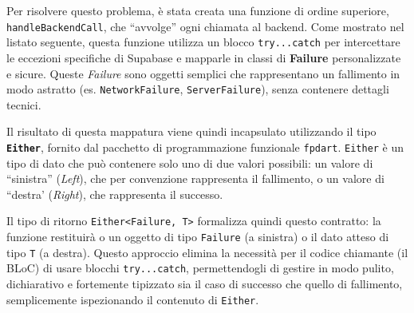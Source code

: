 Per risolvere questo problema, è stata creata una funzione di ordine superiore, \texttt{handleBackendCall}, che ``avvolge'' ogni chiamata al backend.
Come mostrato nel listato seguente, questa funzione utilizza un blocco \texttt{try...catch} per intercettare le eccezioni specifiche di Supabase e mapparle in classi di \textbf{Failure} personalizzate e sicure.
Queste \emph{Failure} sono oggetti semplici che rappresentano un fallimento in modo astratto (es. \texttt{NetworkFailure}, \texttt{ServerFailure}), senza contenere dettagli tecnici.

Il risultato di questa mappatura viene quindi incapsulato utilizzando il tipo \textbf{\texttt{Either}}, fornito dal pacchetto di programmazione funzionale \texttt{fpdart}. \texttt{Either} è un tipo di dato che può contenere solo uno di due valori possibili: un valore di ``sinistra'' (\emph{Left}), che per convenzione rappresenta il fallimento, o un valore di ``destra' (\emph{Right}), che rappresenta il successo.

Il tipo di ritorno \texttt{Either<Failure, T>} formalizza quindi questo contratto: la funzione restituirà o un oggetto di tipo \texttt{Failure} (a sinistra) o il dato atteso di tipo \texttt{T} (a destra).
Questo approccio elimina la necessità per il codice chiamante (il BLoC) di usare blocchi \texttt{try...catch}, permettendogli di gestire in modo pulito, dichiarativo e fortemente tipizzato sia il caso di successo che quello di fallimento, semplicemente ispezionando il contenuto di \texttt{Either}.

